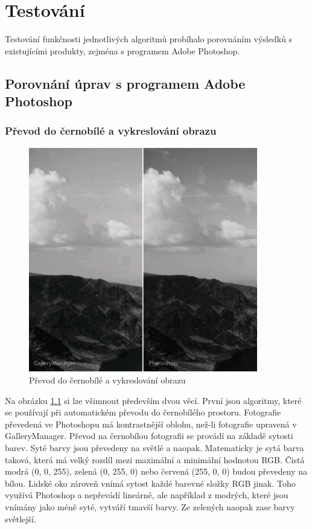 \documentclass[11pt,twoside,a4paper]{book}
\begin{document}
\chapter{Testování}
\noindent
Testování funkčnosti jednotlivých algoritmů probíhalo porovnáním výsledků s existujícími produkty, zejména s programem Adobe Photoshop.

\section{Porovnání úprav s programem Adobe Photoshop}
\subsection{Převod do černobílé a vykreslování obrazu}
\begin{figure}[ht]
\begin{center}
\includegraphics[width=10cm]{figures/bwconvert}
\caption{Převod do černobílé a vykreslování obrazu}
\label{fig:bwconvert}
\end{center}
\end{figure}
\noindent
Na obrázku \ref{fig:bwconvert} si lze všimnout především dvou věcí. První jsou algoritmy, které se používají při automatickém převodu do černobílého prostoru. Fotografie převedená ve Photoshopu má kontrastnější oblohu, než-li fotografie upravená v GalleryManager. Převod na černobílou fotografii se provádí na základě sytosti barev. Syté barvy jsou převedeny na světlé a naopak. Matematicky je sytá barva taková, která má velký rozdíl mezi maximální a minimální hodnotou RGB. Čistá modrá (0, 0, 255), zelená (0, 255, 0) nebo červená (255, 0, 0) budou převedeny na bílou. Lidské oko zároveň vnímá sytost každé barevné složky RGB jinak. Toho využívá Photoshop a nepřevádí lineárně, ale například z modrých, které jsou vnímány jako méně syté, vytváří tmavší barvy. Ze zelených naopak zase barvy světlejší.
\end{document}
